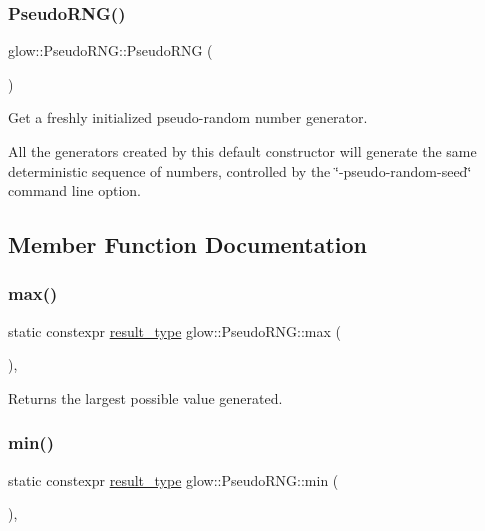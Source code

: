 \subsubsection{\texorpdfstring{Pseudo\+R\+N\+G()}{PseudoRNG()}}
{\footnotesize\ttfamily glow\+::\+Pseudo\+R\+N\+G\+::\+Pseudo\+R\+NG (\begin{DoxyParamCaption}{ }\end{DoxyParamCaption})}

Get a freshly initialized pseudo-\/random number generator.

All the generators created by this default constructor will generate the same deterministic sequence of numbers, controlled by the \char`\"{}-\/pseudo-\/random-\/seed\char`\"{} command line option. 

\subsection{Member Function Documentation}
\mbox{\label{classglow_1_1_pseudo_r_n_g_aa98bf022462ca4fc96382a67d1800a0d}} 
\subsubsection{\texorpdfstring{max()}{max()}}
{\footnotesize\ttfamily static constexpr \hyperlink{classglow_1_1_pseudo_r_n_g_a3fe973c9dca35c5b572da3ed711df069}{result\+\_\+type} glow\+::\+Pseudo\+R\+N\+G\+::max (\begin{DoxyParamCaption}{ }\end{DoxyParamCaption})\hspace{0.3cm}{\ttfamily [inline]}, {\ttfamily [static]}}

\begin{DoxyReturn}{Returns}
the largest possible value generated. 
\end{DoxyReturn}
\mbox{\label{classglow_1_1_pseudo_r_n_g_a3bd34021eb9345528df795dd66f3181a}} 
\subsubsection{\texorpdfstring{min()}{min()}}
{\footnotesize\ttfamily static constexpr \hyperlink{classglow_1_1_pseudo_r_n_g_a3fe973c9dca35c5b572da3ed711df069}{result\+\_\+type} glow\+::\+Pseudo\+R\+N\+G\+::min (\begin{DoxyParamCaption}{ }\end{DoxyParamCaption})\hspace{0.3cm}{\ttfamily [inline]}, {\ttfamily [static]}}

